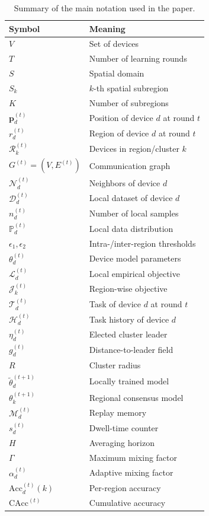 \documentclass[conference]{IEEEtran}
\theoremstyle{plain}
\theoremstyle{definition}
\begin{document}
\begin{table}[t]
\centering
\caption{Summary of the main notation used in the paper.}
\label{tab:notation}
\footnotesize
\renewcommand{\arraystretch}{1.4}
\begin{tabular}{lp{}}
\hline
\textbf{Symbol} & \textbf{Meaning} \\
\hline
$V$ & Set of devices \\
$T$ & Number of learning rounds \\
$S$ & Spatial domain \\
$S_k$ & $k$-th spatial subregion \\
$K$ & Number of subregions \\
$\mathbf{p}^{(t)}_d$ & Position of device $d$ at round $t$ \\
$r^{(t)}_d$ & Region of device $d$ at round $t$ \\
$\mathcal{R}^{(t)}_k$ & Devices in region/cluster $k$ \\
$G^{(t)}=(V,E^{(t)})$ & Communication graph \\
$\mathcal{N}^{(t)}_d$ & Neighbors of device $d$ \\
$\mathcal{D}^{(t)}_d$ & Local dataset of device $d$ \\
$n^{(t)}_d$ & Number of local samples \\
$\mathbb{P}^{(t)}_d$ & Local data distribution \\
$\epsilon_1,\epsilon_2$ & Intra-/inter-region thresholds \\
$\theta^{(t)}_d$ & Device model parameters \\
$\mathcal{L}^{(t)}_d$ & Local empirical objective \\
$\mathcal{J}^{(t)}_k$ & Region-wise objective \\
$\mathcal{T}^{(t)}_d$ & Task of device $d$ at round $t$ \\
$\mathcal{H}^{(t)}_d$ & Task history of device $d$ \\
$\eta^{(t)}_d$ & Elected cluster leader \\
$g^{(t)}_d$ & Distance-to-leader field \\
$R$ & Cluster radius \\
$\widetilde{\theta}^{(t+1)}_d$ & Locally trained model \\
$\theta^{(t+1)}_k$ & Regional consensus model \\
$\mathcal{M}^{(t)}_d$ & Replay memory \\
$s^{(t)}_d$ & Dwell-time counter \\
$H$ & Averaging horizon \\
$\Gamma$ & Maximum mixing factor \\
$\alpha^{(t)}_d$ & Adaptive mixing factor \\
$\mathrm{Acc}^{(t)}_d(k)$ & Per-region accuracy \\
$\mathrm{CAcc}^{(t)}$ & Cumulative accuracy \\
\hline
\end{tabular}
\end{table}
\end{document}
